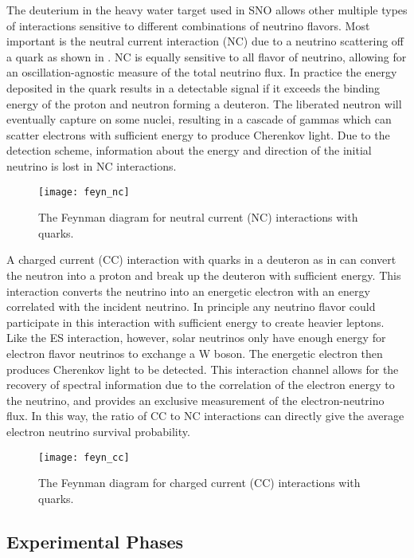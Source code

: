 The deuterium in the heavy water target used in SNO allows other multiple types of interactions sensitive to different combinations of neutrino flavors.
Most important is the neutral current interaction (NC) due to a neutrino scattering off a quark as shown in .
NC is equally sensitive to all flavor of neutrino, allowing for an oscillation-agnostic measure of the total neutrino flux.
In practice the energy deposited in the quark results in a detectable signal if it exceeds the binding energy of the proton and neutron forming a deuteron.
The liberated neutron will eventually capture on some nuclei, resulting in a cascade of gammas which can scatter electrons with sufficient energy to produce Cherenkov light.
Due to the detection scheme, information about the energy and direction of the initial neutrino is lost in NC interactions.

\begin{figure}
\centering
    \texttt{[image: feyn\_nc]}
    \caption{\label{fig:NC}The Feynman diagram for neutral current (NC) interactions with quarks.}
\end{figure}

A charged current (CC) interaction with quarks in a deuteron as in  can convert the neutron into a proton and break up the deuteron with sufficient energy.
This interaction converts the neutrino into an energetic electron with an energy correlated with the incident neutrino.
In principle any neutrino flavor could participate in this interaction with sufficient energy to create heavier leptons.
Like the ES interaction, however, solar neutrinos only have enough energy for electron flavor neutrinos to exchange a W boson.
The energetic electron then produces Cherenkov light to be detected.
This interaction channel allows for the recovery of spectral information due to the correlation of the electron energy to the neutrino, and provides an exclusive measurement of the electron-neutrino flux. 
In this way, the ratio of CC to NC interactions can directly give the average electron neutrino survival probability.

\begin{figure}
\centering
\texttt{[image: feyn\_cc]}
\caption{\label{fig:CC}The Feynman diagram for charged current (CC) interactions with quarks.}
\end{figure}

\subsection{Experimental Phases}

